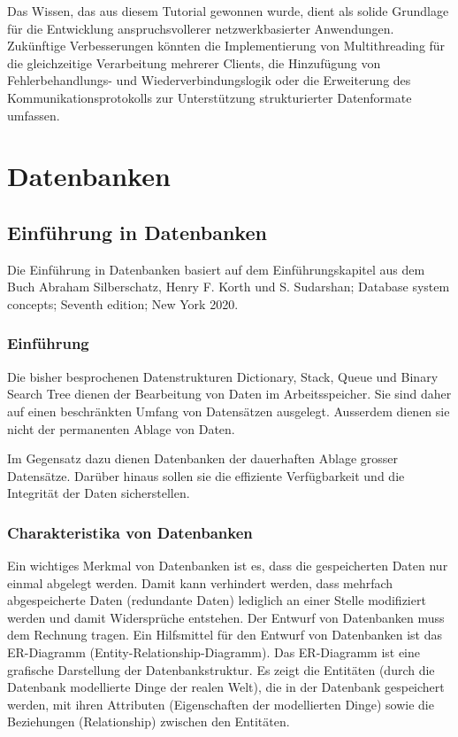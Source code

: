 \documentclass[
  nswissgerman,
  a4paper,
  DIV=11,
  numbers=noendperiod,
  ngerman]{scrreprt}
\begin{document}
Das Wissen, das aus diesem Tutorial gewonnen wurde, dient als solide
Grundlage für die Entwicklung anspruchsvollerer netzwerkbasierter
Anwendungen. Zukünftige Verbesserungen könnten die Implementierung von
Multithreading für die gleichzeitige Verarbeitung mehrerer Clients, die
Hinzufügung von Fehlerbehandlungs- und Wiederverbindungslogik oder die
Erweiterung des Kommunikationsprotokolls zur Unterstützung
strukturierter Datenformate umfassen.

\part{Datenbanken}

\chapter{Einführung in Datenbanken}\label{einfuxfchrung-in-datenbanken}

Die Einführung in Datenbanken basiert auf dem Einführungskapitel aus dem
Buch Abraham Silberschatz, Henry F. Korth und S. Sudarshan; Database
system concepts; Seventh edition; New York 2020.

\section{Einführung}\label{einfuxfchrung}

Die bisher besprochenen Datenstrukturen Dictionary, Stack, Queue und
Binary Search Tree dienen der Bearbeitung von Daten im Arbeitsspeicher.
Sie sind daher auf einen beschränkten Umfang von Datensätzen ausgelegt.
Ausserdem dienen sie nicht der permanenten Ablage von Daten.

Im Gegensatz dazu dienen Datenbanken der dauerhaften Ablage grosser
Datensätze. Darüber hinaus sollen sie die effiziente Verfügbarkeit und
die Integrität der Daten sicherstellen.

\section{Charakteristika von
Datenbanken}\label{charakteristika-von-datenbanken}

Ein wichtiges Merkmal von Datenbanken ist es, dass die gespeicherten
Daten nur einmal abgelegt werden. Damit kann verhindert werden, dass
mehrfach abgespeicherte Daten (redundante Daten) lediglich an einer
Stelle modifiziert werden und damit Widersprüche entstehen. Der Entwurf
von Datenbanken muss dem Rechnung tragen. Ein Hilfsmittel für den
Entwurf von Datenbanken ist das ER-Diagramm
(Entity-Relationship-Diagramm). Das ER-Diagramm ist eine grafische
Darstellung der Datenbankstruktur. Es zeigt die Entitäten (durch die
Datenbank modellierte Dinge der realen Welt), die in der Datenbank
gespeichert werden, mit ihren Attributen (Eigenschaften der modellierten
Dinge) sowie die Beziehungen (Relationship) zwischen den Entitäten.
\end{document}
